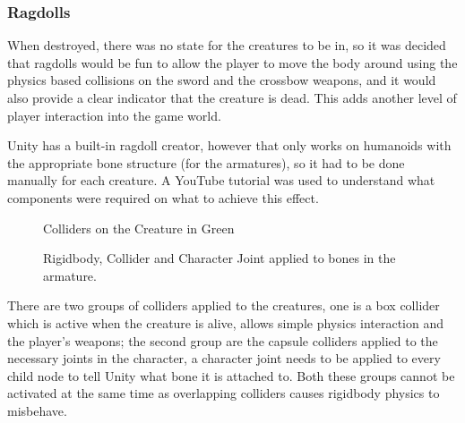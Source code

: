 \documentclass[11pt]{report}
\begin{document}
\subsubsection{Ragdolls}
When destroyed, there was no state for the creatures to be in, so it was decided that ragdolls would be fun to allow the player to move the body around using the physics based collisions on the sword and the crossbow weapons, and it would also provide a clear indicator that the creature is dead. This adds another level of player interaction into the game world.

Unity has a built-in ragdoll creator, however that only works on humanoids with the appropriate bone structure (for the armatures), so it had to be done manually for each creature. A YouTube tutorial was used to understand what components were required on what to achieve this effect. \cite{RagdollTutorial}
\begin{figure}[H]
    \begin{minipage}{.5\textwidth}
        \centering
        \caption{Colliders on the Creature in Green}
    \end{minipage}
    \begin{minipage}{.5\textwidth}
        \centering
        \caption{Rigidbody, Collider and Character Joint applied to bones in the armature.}
    \end{minipage}
\end{figure}
There are two groups of colliders applied to the creatures, one is a box collider which is active when the creature is alive, allows simple physics interaction and the player's weapons; the second group are the capsule colliders applied to the necessary joints in the character, a character joint needs to be applied to every child node to tell Unity what bone it is attached to. Both these groups cannot be activated at the same time as overlapping colliders causes rigidbody physics to misbehave.
\end{document}
